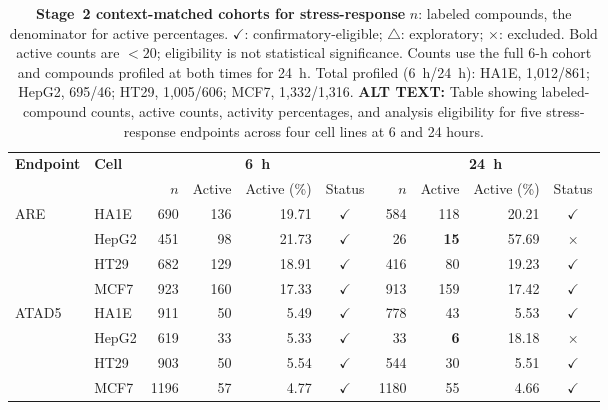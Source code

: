 \documentclass[11pt,a4paper]{article}
\begin{document}
\begin{landscape}
\begingroup
\begin{table}[p]
\centering
\captionsetup{width=\linewidth}
\caption{\textbf{Stage~2 context-matched cohorts for stress-response}
\(n\): labeled compounds, the denominator for active percentages.
\(\checkmark\): confirmatory-eligible; \(\triangle\): exploratory;
\(\times\): excluded. Bold active counts are \(<20\); eligibility is not
statistical significance. Counts use the full 6-h cohort and compounds
profiled at both times for 24~h. Total profiled (6~h/24~h):
HA1E, 1,012/861; HepG2, 695/46; HT29, 1,005/606; MCF7, 1,332/1,316. \textbf{ALT TEXT:}
Table showing labeled-compound counts, active counts, activity percentages,
and analysis eligibility for five stress-response endpoints across four
cell lines at 6 and 24 hours.}
\label{tab:stress-response-task-cell-counts}
\fontsize{13}{15}\selectfont
\setlength{\tabcolsep}{4pt}
\renewcommand{\arraystretch}{1.0}
\setlength{\aboverulesep}{1pt}
\setlength{\belowrulesep}{1pt}
\begin{tabular*}{\linewidth}{@{\extracolsep{\fill}}ll|rrrcrrrc@{}} %
\toprule
\multirow[c]{2}{*}{\textbf{Endpoint}} &
\multirow[c]{2}{*}{\textbf{Cell}} &
\multicolumn{4}{c}{\textbf{6~h}} &
\multicolumn{4}{c}{\textbf{24~h}} \\
\cmidrule(lr){3-6}\cmidrule(lr){7-10}
& & \(n\) & Active & Active (\%) & Status &
\(n\) & Active & Active (\%) & Status \\
\midrule
\multirow[c]{4}{*}{ARE} & HA1E & 690 & 136 & 19.71 & \(\checkmark\) & 584 & 118 & 20.21 & \(\checkmark\) \\
 & HepG2 & 451 & 98 & 21.73 & \(\checkmark\) & 26 & \textbf{15} & 57.69 & \(\times\) \\
 & HT29 & 682 & 129 & 18.91 & \(\checkmark\) & 416 & 80 & 19.23 & \(\checkmark\) \\
 & MCF7 & 923 & 160 & 17.33 & \(\checkmark\) & 913 & 159 & 17.42 & \(\checkmark\) \\
\midrule
\multirow[c]{4}{*}{ATAD5} & HA1E & 911 & 50 & 5.49 & \(\checkmark\) & 778 & 43 & 5.53 & \(\checkmark\) \\
 & HepG2 & 619 & 33 & 5.33 & \(\checkmark\) & 33 & \textbf{6} & 18.18 & \(\times\) \\
 & HT29 & 903 & 50 & 5.54 & \(\checkmark\) & 544 & 30 & 5.51 & \(\checkmark\) \\
 & MCF7 & 1196 & 57 & 4.77 & \(\checkmark\) & 1180 & 55 & 4.66 & \(\checkmark\) \\

\end{tabular*}
\end{table}
\end{landscape}
\end{document}
